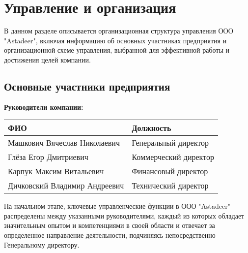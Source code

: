 \section{Управление и организация}

В данном разделе описывается организационная структура управления ООО "Astadeer", включая информацию об основных участниках предприятия и организационной схеме управления, выбранной для эффективной работы и достижения целей компании.

\subsection{Основные участники предприятия}

{\Large \textbf{Руководители компании:} \par} %
\vspace{0.2cm}

\begin{center} %
\begin{tabular}{ll} %
    \textbf{ФИО} & \textbf{Должность} \\ %
    \hline
    Машкович Вячеслав Николаевич & Генеральный директор \\
    Глёза Егор Дмитриевич & Коммерческий директор \\
    Карпук Максим Витальевич & Финансовый директор \\
    Дичковский Владимир Андреевич & Технический директор \\
\end{tabular}
\end{center}
\vspace{1.5cm}

На начальном этапе, ключевые управленческие функции в ООО "Astadeer" распределены между указанными руководителями, каждый из которых обладает значительным опытом и компетенциями в своей области и отвечает за определенное направление деятельности, подчиняясь непосредственно Генеральному директору.


